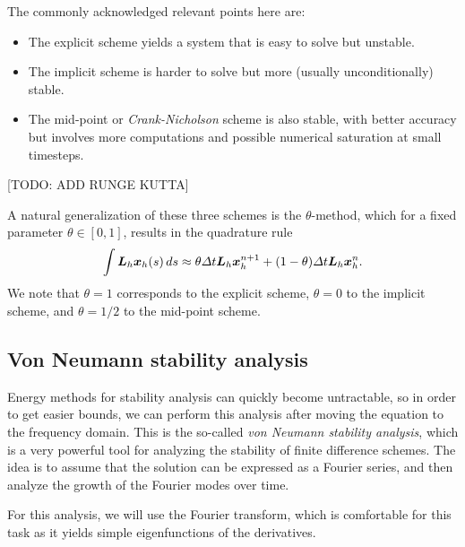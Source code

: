 \documentclass{article}
\renewcommand{\vec}{\vectorsym}
\newcommand{\mat}{\matrixsym}
\begin{document}
    The commonly acknowledged relevant points here are: 
    \begin{itemize}
        \item The explicit scheme yields a system that is easy to solve but unstable.
        \item The implicit scheme is harder to solve but more (usually unconditionally) stable.
        \item The mid-point or \emph{Crank-Nicholson} scheme is also stable, with better accuracy but involves more computations and possible numerical saturation at small timesteps.
    \end{itemize}
    
    [TODO: ADD RUNGE KUTTA]

    A natural generalization of these three schemes is the $\theta$-method, which for a fixed parameter $\theta\in[0,1]$, results in the quadrature rule
    $$\int \mat L_h \vec x_h(s)\,ds \approx \theta\Delta t \mat L_h\vec x_h^{n+1} + (1-\theta)\Delta t \mat L_h \vec x_h^n. $$
    We note that $\theta=1$ corresponds to the explicit scheme, $\theta=0$ to the implicit scheme, and $\theta=1/2$ to the mid-point scheme. 
    
\subsection{Von Neumann stability analysis}
Energy methods for stability analysis can quickly become untractable, so in order to get easier bounds, we can perform this analysis after moving the equation to the frequency domain. This is the so-called \emph{von Neumann stability analysis}, which is a very powerful tool for analyzing the stability of finite difference schemes. The idea is to assume that the solution can be expressed as a Fourier series, and then analyze the growth of the Fourier modes over time.

For this analysis, we will use the Fourier transform, which is comfortable for this task as it yields simple eigenfunctions of the derivatives. 
\end{document}
